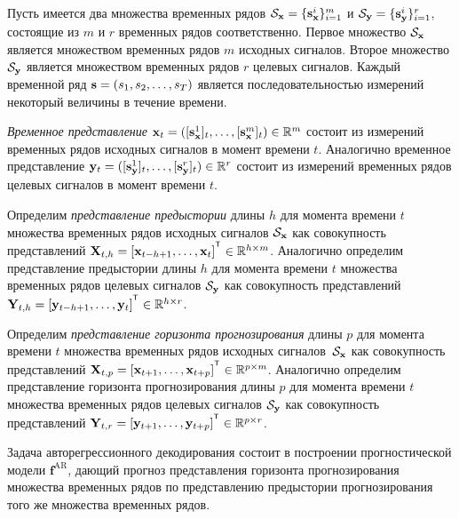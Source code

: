 \documentclass[11pt, a5paper]{dissert}
\begin{document}
Пусть имеется два множества временных рядов $\mathcal{S}_{\mathbf{x}} = \{\mathbf{s}_{\mathbf{x}}^i\}_{i=1}^m$ и $\mathcal{S}_{\mathbf{y}} = \{\mathbf{s}_{\mathbf{y}}^i\}_{i=1}^r$, состоящие из $m$ и $r$ временных рядов соответственно. 
Первое множество $\mathcal{S}_{\mathbf{x}}$ является множеством временных рядов $m$ исходных сигналов. 
Второе множество $\mathcal{S}_{\mathbf{y}}$ является множеством временных рядов $r$ целевых сигналов.
Каждый временной ряд $\mathbf{s} = (s_1, s_2, \dots, s_T)$ является последовательностью измерений некоторый величины в течение времени. 
\begin{definition}
	 \textit{Временное представление} $\mathbf{x}_t = ([\mathbf{s}_{\mathbf{x}}^1]_t, \dots, [\mathbf{s}_{\mathbf{x}}^m]_t) \in \mathbb{R}^m$ состоит из измерений временных рядов исходных сигналов в момент времени $t$. 
	Аналогично временное представление $\mathbf{y}_t = ([\mathbf{s}_{\mathbf{y}}^1]_t, \dots, [\mathbf{s}_{\mathbf{y}}^r]_t) \in \mathbb{R}^r$ состоит из измерений временных рядов целевых сигналов в момент времени $t$.
\end{definition}
\begin{definition}
	Определим \textit{представление предыстории} длины $h$ для момента времени $t$ множества временных рядов исходных сигналов $\mathcal{S}_{\mathbf{x}}$ как совокупность представлений $\bX_{t,h} = [\bx_{t - h + 1}, \dots, \bx_{t}]^{\T} \in \bbR^{h \times m}$.
	Аналогично определим представление предыстории длины $h$ для момента времени $t$ множества временных рядов целевых сигналов $\mathcal{S}_{\mathbf{y}}$ как совокупность представлений $\bY_{t,h} = [\by_{t - h + 1}, \dots, \by_{t}]^{\T} \in \bbR^{h \times r}$.
\end{definition}
\begin{definition}
	Определим \textit{представление горизонта прогнозирования} длины $p$ для момента времени $t$ множества временных рядов исходных сигналов~$\mathcal{S}_{\mathbf{x}}$ как совокупность представлений $\bX_{t,p} = [\bx_{t + 1}, \dots, \bx_{t + p}]^{\T} \in \bbR^{p \times m}$.
	Аналогично определим представление горизонта прогнозирования длины $p$ для момента времени $t$ множества временных рядов целевых сигналов $\mathcal{S}_{\mathbf{y}}$ как совокупность представлений $\bY_{t,r} = [\by_{t + 1}, \dots, \by_{t + p}]^{\T} \in \bbR^{p \times r}$.
\end{definition}

Задача авторегрессионного декодирования состоит в построении прогностической модели $\mathbf{f}^{\text{AR}}$, дающий прогноз представления горизонта прогнозирования множества временных рядов по представлению предыстории прогнозирования того же множества временных рядов.
\end{document}
